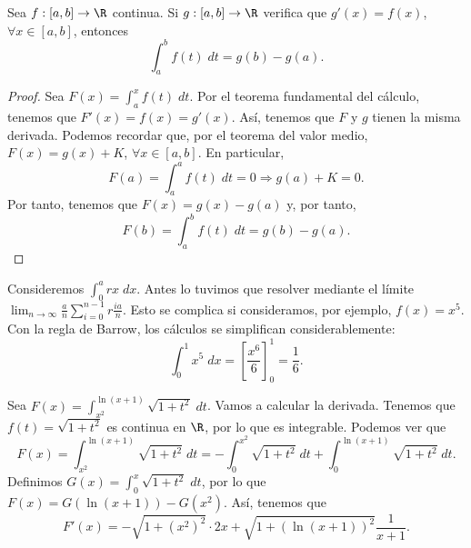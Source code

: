 \begin{fcolorary}
	\normalfont Sea $\displaystyle f : \left[a,b\right] \to \R $ continua. Si $\displaystyle g : \left[a,b\right] \to \R $ verifica que $\displaystyle g'\left(x\right) = f\left(x\right) $, $\displaystyle \forall x \in \left[a,b\right]  $, entonces
	\[ \int^{b}_{a} f\left(t\right) \; dt = g\left(b\right)-g\left(a\right) .\]
\end{fcolorary}
\begin{proof}
	Sea $\displaystyle F\left(x\right) = \int^{x}_{a} f\left(t\right) \; dt $. Por el teorema fundamental del cálculo, tenemos que $\displaystyle F'\left(x\right) = f\left(x\right) = g'\left(x\right) $. Así, tenemos que $\displaystyle F $ y $\displaystyle g $ tienen la misma derivada. Podemos recordar que, por el teorema del valor medio, $\displaystyle F\left(x\right) = g\left(x\right) + K $, $\displaystyle \forall x \in [a,b] $. 
	En particular,
	\[ F\left(a\right) =\int^{a}_{a} f\left(t\right) \; dt = 0 \Rightarrow g\left(a\right) + K = 0.\]
	Por tanto, tenemos que $\displaystyle F\left(x\right) = g\left(x\right)-g\left(a\right) $ y, por tanto,
	\[F\left(b\right) = \int^{b}_{a} f\left(t\right) \; dt = g\left(b\right)-g\left(a\right) .\]
\end{proof}
\begin{eg}
\normalfont Consideremos $\displaystyle \int^{a}_{0} rx \; dx $. Antes lo tuvimos que resolver mediante el límite $\displaystyle \lim_{n \to \infty}\frac{a}{n}\sum^{n-1}_{i=0}r\frac{ia}{n} $. Esto se complica si consideramos, por ejemplo, $\displaystyle f\left(x\right) = x^{5} $. Con la regla de Barrow, los cálculos se simplifican considerablemente:
\[ \int^{1}_{0} x^{5} \; dx = \left[\frac{x^{6}}{6}\right] ^{1}_{0} = \frac{1}{6} .\]
\end{eg}
\begin{eg}
\normalfont Sea $\displaystyle F\left(x\right) = \int^{\ln\left(x+1\right)}_{x^{2}} \sqrt{1 + t ^{2}} \; dt $. Vamos a calcular la derivada. Tenemos que $\displaystyle f\left(t\right) = \sqrt{1 + t ^{2}} $ es continua en $\displaystyle \R $, por lo que es integrable. Podemos ver que 
\[ F\left(x\right) = \int^{\ln\left(x+1\right)}_{x^{2}} \sqrt{1 + t ^{2}} \; dt = - \int^{x^{2}}_{0} \sqrt{1 + t ^{2}} \; dt + \int^{\ln\left(x+1\right)}_{0} \sqrt{1 + t ^{2}} \; dt .\]
Definimos $\displaystyle G\left(x\right) = \int^{x}_{0} \sqrt{1 + t ^{2}} \; dt $, por lo que $\displaystyle F\left(x\right) = G\left(\ln\left(x+1\right)\right)-G\left(x^{2}\right) $. Así, tenemos que
\[ F'\left(x\right) = -\sqrt{1 + \left(x^{2}\right)^{2}} \cdot2x + \sqrt{1 + \left(\ln\left(x+1\right)\right)^{2}}\frac{1}{x+1}.\]
\end{eg}
